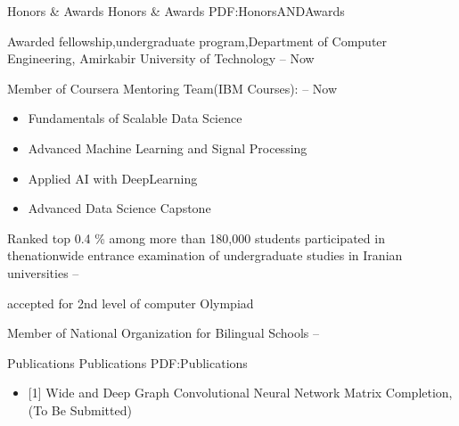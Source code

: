\documentclass[letterpaper,MMMyyyy,nonstopmode]{simpleresumecv}
\begin{document}
\begin{Body}
\begin{Detail}
\end{Detail}











\Gap




\Section
{Honors \&\newline
Awards}
{Honors \& Awards}
{PDF:HonorsANDAwards}


\BulletItem
  Awarded fellowship,undergraduate program,Department of Computer Engineering, Amirkabir University of Technology
  \hfill
{} --
Now


\BulletItem
  Member of Coursera Mentoring Team(IBM Courses):
  \hfill
{} --
Now
   \begin{itemize}
       \item Fundamentals of Scalable Data Science
         \item  Advanced Machine Learning and Signal Processing
           \item Applied AI with DeepLearning  
             \item    Advanced Data Science Capstone
   \end{itemize}
\hfill


\BulletItem
Ranked top 0.4 \% among more than 180,000 students participated
in the\newline nationwide entrance examination of undergraduate studies
in Iranian universities  
\hfill
{} --

\BulletItem
 accepted for 2nd level of computer Olympiad 
\hfill
{}


\BulletItem
 Member of National Organization for Bilingual Schools
\hfill
{} --


\Section
{Publications}
{Publications}
{PDF:Publications}
\begin{itemize}
    
\item
{[1] Wide and Deep Graph Convolutional Neural Network Matrix Completion, (To Be Submitted)
\hfill

}


\end{itemize}
\end{Body}
\end{document}
